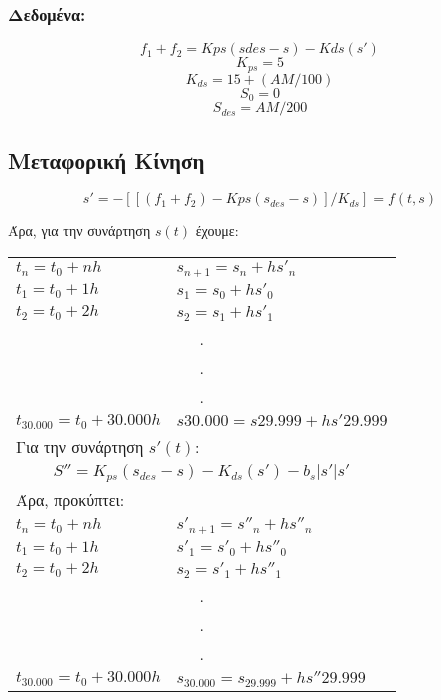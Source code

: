 \documentclass[a4paper]{article}
\begin{document}
        \subsubsection{Δεδομένα:}
        \begin{equation}
            f_1 + f_2 = Kps (sdes - s) - Kds (s')
        \end{equation}
        \begin{equation}
            K_{ps} = 5
        \end{equation}
        \begin{equation}
            K_{ds} = 15 + (AM/ 100)
        \end{equation}
        \begin{equation}
            S_0 =0
        \end{equation}
        \begin{equation}
            S_{des} = AM / 200
        \end{equation}
            
        

        \subsection{Μεταφορική Κίνηση}

        \[s' = - [ [ (f_1 + f_2 ) - Kps (s_{des} - s) ]/ K_{ds} ] = f(t,s)\]

        Άρα, για την συνάρτηση $s(t)$ έχουμε:
        
        \begin{tabular}{ll}
            $t_n = t_0 + nh$		&			$s_{n+1} = s_n  + hs'_n$ \\
            $t_1 = t_0  + 1h$			&		   $s_1    = s_0  + hs'_0$ \\
            $t_2 = t_0  + 2h$			&		   $s_2    = s_1  + hs'_1$ \\
            \multicolumn{2}{c}{.}\\
            \multicolumn{2}{c}{.}\\
            \multicolumn{2}{c}{.}\\
            $t_{30.000} = t_0 + 30.000h$&			    $s30.000 = s29.999 + hs'29.999$\\
            \multicolumn{2}{l}{Για την συνάρτηση $s'(t)$:}\\
            \multicolumn{2}{c}{$S''	= K_{ps}(s_{des} - s) - K_{ds}(s') - b_s|s'|s'$}\\
            \multicolumn{2}{l}{Άρα, προκύπτει:}\\
            $t_n = t_0 + nh$		&			$s'_{n+1} = s''_n  + hs''_n$\\
            $t_1 = t_0  + 1h$			&		   $s'_1    = s'_0  + hs''_0$\\
            $t_2 = t_0  + 2h$			&		   $s_2    = s'_1  + hs''_1$\\
            \multicolumn{2}{c}{.}\\
            \multicolumn{2}{c}{.}\\
            \multicolumn{2}{c}{.}\\
            $t_{30.000} = t_0 + 30.000h$&			   $s_{30.000} = s_{29.999} + hs''29.999$
        \end{tabular}
\end{document}
